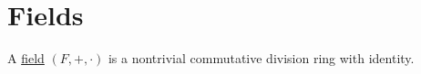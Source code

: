 \section{Fields}\label{sec:fields}

\begin{definition}\label{def:field}
  A \ul{field} $(F, +, \cdot)$ is a nontrivial commutative division ring with identity.
\end{definition}
